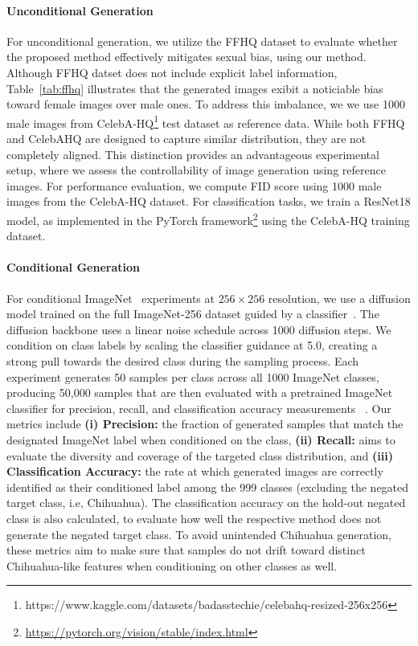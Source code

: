 \paragraph{Unconditional Generation}
For unconditional generation, we utilize the FFHQ dataset to evaluate whether the proposed method effectively mitigates sexual bias, using our method. Although FFHQ datset does not include explicit label information, Table~\ref{tab:ffhq} illustrates that the generated images exibit a noticiable bias toward female images over male ones. To address this imbalance, we we use 1000 male images from CelebA-HQ\footnote{https://www.kaggle.com/datasets/badasstechie/celebahq-resized-256x256} test dataset as reference data. While both FFHQ and CelebAHQ are designed to capture similar distribution, they are not completely aligned. This distinction provides an advantageous experimental setup, where we assess the controllability of image generation using reference images. For performance evaluation, we compute FID score using 1000 male images from the CelebA-HQ dataset. 
For classification tasks, we train a ResNet18 model, as implemented in the PyTorch framework\footnote{\url{https://pytorch.org/vision/stable/index.html}} using the CelebA-HQ training dataset. 

\paragraph{Conditional Generation}
For conditional ImageNet~\cite{russakovsky2015imagenet} experiments at $256 \times 256$ resolution, we use a diffusion model trained on the full ImageNet-256 dataset guided by a classifier~\cite{dhariwal2021diffusion}. The diffusion backbone uses a linear noise schedule across 1000 diffusion steps. We condition on class labels by scaling the classifier guidance at 5.0, creating a strong pull towards the desired class during the sampling process. Each experiment generates 50 samples per class across all 1000 ImageNet classes, producing 50,000 samples that are then evaluated with a pretrained ImageNet classifier for precision, recall, and classification accuracy measurements ~\cite{he2016dppresnet50}. Our metrics include \textbf{(i) Precision: } the fraction of generated samples that match the designated ImageNet label when conditioned on the class, \textbf{(ii) Recall: } aims to evaluate the diversity and coverage of the targeted class distribution, and \textbf{(iii) Classification Accuracy: } the rate at which generated images are correctly identified as their conditioned label among the 999 classes (excluding the negated target class, i.e, Chihuahua). The classification accuracy on the hold-out negated class is also calculated, to evaluate how well the respective method does not generate the negated target class. To avoid unintended Chihuahua generation, these metrics aim to make sure that samples do not drift toward distinct Chihuahua-like features when conditioning on other classes as well. 

